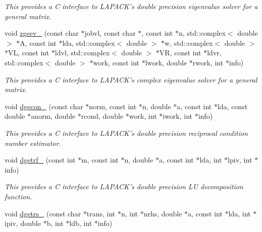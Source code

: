 \begin{DoxyCompactItemize}
\begin{DoxyCompactList}\small\item\em This provides a C interface to L\-A\-P\-A\-C\-K's double precision eigenvalue solver for a general matrix. \end{DoxyCompactList}\item 
\hypertarget{namespacekeycpp_a8c1cca2a162f40fc6c6218c35cadf9f2}{void \hyperlink{namespacekeycpp_a8c1cca2a162f40fc6c6218c35cadf9f2}{zgeev\-\_\-} (const char $\ast$jobvl, const char $\ast$, const int $\ast$n, std\-::complex$<$ double $>$ $\ast$A, const int $\ast$lda, std\-::complex$<$ double $>$ $\ast$w, std\-::complex$<$ double $>$ $\ast$V\-L, const int $\ast$ldvl, std\-::complex$<$ double $>$ $\ast$V\-R, const int $\ast$ldvr, std\-::complex$<$ double $>$ $\ast$work, const int $\ast$lwork, double $\ast$rwork, int $\ast$info)}\label{namespacekeycpp_a8c1cca2a162f40fc6c6218c35cadf9f2}

\begin{DoxyCompactList}\small\item\em This provides a C interface to L\-A\-P\-A\-C\-K's complex eigenvalue solver for a general matrix. \end{DoxyCompactList}\item 
\hypertarget{namespacekeycpp_aca3be6524e195662cbb74a810305e721}{void \hyperlink{namespacekeycpp_aca3be6524e195662cbb74a810305e721}{dgecon\-\_\-} (const char $\ast$norm, const int $\ast$n, double $\ast$a, const int $\ast$lda, const double $\ast$anorm, double $\ast$rcond, double $\ast$work, int $\ast$iwork, int $\ast$info)}\label{namespacekeycpp_aca3be6524e195662cbb74a810305e721}

\begin{DoxyCompactList}\small\item\em This provides a C interface to L\-A\-P\-A\-C\-K's double precision reciprocal condition number estimator. \end{DoxyCompactList}\item 
\hypertarget{namespacekeycpp_a75e334ffaf1864d7191e9e0b64189783}{void \hyperlink{namespacekeycpp_a75e334ffaf1864d7191e9e0b64189783}{dgetrf\-\_\-} (const int $\ast$m, const int $\ast$n, double $\ast$a, const int $\ast$lda, int $\ast$lpiv, int $\ast$info)}\label{namespacekeycpp_a75e334ffaf1864d7191e9e0b64189783}

\begin{DoxyCompactList}\small\item\em This provides a C interface to L\-A\-P\-A\-C\-K's double precision L\-U decomposition function. \end{DoxyCompactList}\item 
\hypertarget{namespacekeycpp_ab9c33788a2c083aa5738eda1fe62a261}{void \hyperlink{namespacekeycpp_ab9c33788a2c083aa5738eda1fe62a261}{dgetrs\-\_\-} (const char $\ast$trans, int $\ast$n, int $\ast$nrhs, double $\ast$a, const int $\ast$lda, int $\ast$ipiv, double $\ast$b, int $\ast$ldb, int $\ast$info)}\label{namespacekeycpp_ab9c33788a2c083aa5738eda1fe62a261}


\end{DoxyCompactItemize}
